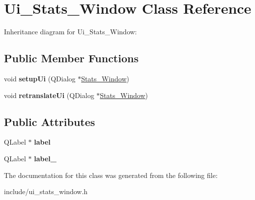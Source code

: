 \hypertarget{classUi__Stats__Window}{}\section{Ui\+\_\+\+Stats\+\_\+\+Window Class Reference}
\label{classUi__Stats__Window}


Inheritance diagram for Ui\+\_\+\+Stats\+\_\+\+Window\+:
\subsection*{Public Member Functions}
\begin{DoxyCompactItemize}
\item 
\mbox{\label{classUi__Stats__Window_a368b99ae59968202a7eab450db2b5462}} 
void {\bfseries setup\+Ui} (Q\+Dialog $\ast$\hyperlink{classStats__Window}{Stats\+\_\+\+Window})
\item 
\mbox{\label{classUi__Stats__Window_acf4fa33632ab91a2f9ed3a298a079bf6}} 
void {\bfseries retranslate\+Ui} (Q\+Dialog $\ast$\hyperlink{classStats__Window}{Stats\+\_\+\+Window})
\end{DoxyCompactItemize}
\subsection*{Public Attributes}
\begin{DoxyCompactItemize}
\item 
\mbox{\label{classUi__Stats__Window_afc89e35856fc4150f5340be6a3046390}} 
Q\+Label $\ast$ {\bfseries label}
\item 
\mbox{\label{classUi__Stats__Window_a15984ffdafefcaaa9d9631ffcb1e23ed}} 
Q\+Label $\ast$ {\bfseries label\+\_}
\end{DoxyCompactItemize}


The documentation for this class was generated from the following file\+:\begin{DoxyCompactItemize}
\item 
include/ui\+\_\+stats\+\_\+window.\+h\end{DoxyCompactItemize}
